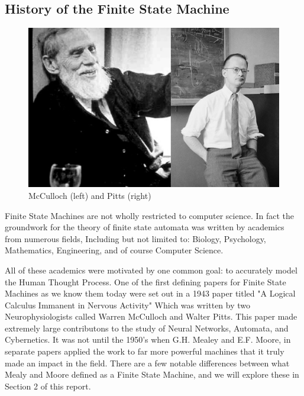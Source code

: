 \documentclass{article}
\begin{document}
\subsection{History of the Finite State Machine}
\begin{figure} [h!]
	\centering
	\includegraphics[scale=0.1]{mccullochpitts.jpg}
	\caption{McCulloch (left) and Pitts (right)}
	\label{fig:fsm}
\end{figure}
Finite State Machines are not wholly restricted to computer science. In fact the groundwork for the theory of finite state automata was written by academics from numerous fields, Including but not limited to: Biology, Psychology, Mathematics, Engineering, and of course Computer Science. 
\par\null\par
All of these academics were motivated by one common goal: to accurately model the Human Thought Process. 
One of the first defining papers for Finite State Machines as we know them today were set out in a 1943 paper titled "A Logical Calculus Immanent in Nervous Activity" Which was written by two Neurophysiologists called Warren McCulloch and Walter Pitts. This paper made extremely large contributons to the study of Neural Networks, Automata, and Cybernetics. It was not until the 1950's when G.H. Mealey and E.F. Moore, in separate papers applied the work to far more powerful machines that it truly made an impact in the field. There are a few notable differences between what Mealy and Moore defined as a Finite State Machine, and we will explore these in Section 2 of this report.
\end{document}
